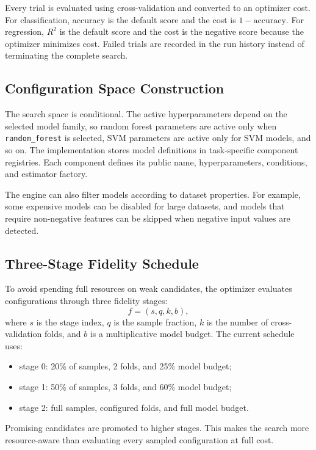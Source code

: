 \documentclass[12pt,a4paper]{report}
\begin{document}
Every trial is evaluated using cross-validation and converted to an optimizer
cost. For classification, accuracy is the default score and the cost is
$1-\text{accuracy}$. For regression, $R^2$ is the default score and the cost is
the negative score because the optimizer minimizes cost. Failed trials are
recorded in the run history instead of terminating the complete search.

\subsection{Configuration Space Construction}
The search space is conditional. The active hyperparameters depend on the
selected model family, so random forest parameters are active only when
\texttt{random\_forest} is selected, SVM parameters are active only for SVM
models, and so on. The implementation stores model definitions in task-specific
component registries. Each component defines its public name, hyperparameters,
conditions, and estimator factory.

The engine can also filter models according to dataset properties. For example,
some expensive models can be disabled for large datasets, and models that
require non-negative features can be skipped when negative input values are
detected.

\subsection{Three-Stage Fidelity Schedule}
To avoid spending full resources on weak candidates, the optimizer evaluates
configurations through three fidelity stages:
\[
  f = (s, q, k, b),
\]
where $s$ is the stage index, $q$ is the sample fraction, $k$ is the number of
cross-validation folds, and $b$ is a multiplicative model budget. The current
schedule uses:
\begin{itemize}
  \item stage 0: 20\% of samples, 2 folds, and 25\% model budget;
  \item stage 1: 50\% of samples, 3 folds, and 60\% model budget;
  \item stage 2: full samples, configured folds, and full model budget.
\end{itemize}
Promising candidates are promoted to higher stages. This makes the search more
resource-aware than evaluating every sampled configuration at full cost.
\end{document}
